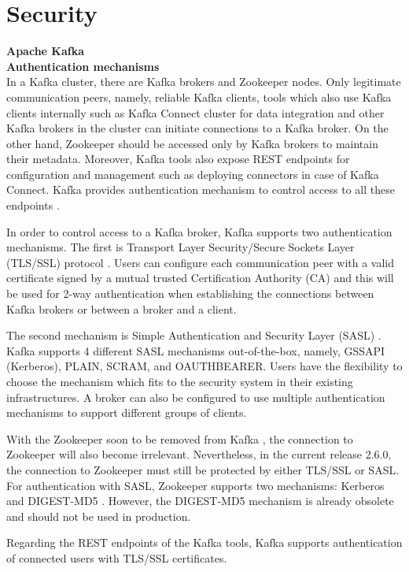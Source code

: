 \section{Security} \label{section:security}
\large \textbf{Apache Kafka}\\
\normalsize
\textbf{Authentication mechanisms}\\
In a Kafka cluster, there are Kafka brokers and Zookeeper nodes. Only legitimate communication peers, namely, reliable Kafka clients, tools which also use Kafka clients internally such as Kafka Connect cluster for data integration and other Kafka brokers in the cluster can initiate connections to a Kafka broker. On the other hand, Zookeeper should be accessed only by Kafka brokers to maintain their metadata. Moreover, Kafka tools also expose REST endpoints for configuration and management such as deploying connectors in case of Kafka Connect. Kafka provides authentication mechanism to control access to all these endpoints \cite{kafkasecurity}.

In order to control access to a Kafka broker, Kafka supports two authentication mechanisms. The first is Transport Layer  Security/Secure Sockets Layer (TLS/SSL) protocol \cite{tls}. Users can configure each communication peer with a valid certificate signed by a mutual trusted Certification Authority (CA) and this will be used for 2-way authentication when establishing the connections between Kafka brokers or between a broker and a client. 

The second mechanism is Simple Authentication and  Security Layer (SASL) \cite{sasl}. Kafka supports 4 different SASL mechanisms out-of-the-box, namely, GSSAPI (Kerberos), PLAIN, SCRAM, and OAUTHBEARER. Users have the flexibility to choose the mechanism which fits to the security system in their existing infrastructures. A broker can also be configured to use multiple authentication mechanisms to support different groups of clients. 

With the Zookeeper soon to be removed from Kafka \cite{kafkaremovezookeeper}, the connection to Zookeeper will also become irrelevant. Nevertheless, in the current release 2.6.0, the connection to Zookeeper must still be protected by either TLS/SSL or SASL. For authentication with SASL, Zookeeper supports two mechanisms: Kerberos and DIGEST-MD5 \cite{zookeepersecurity}. However, the DIGEST-MD5 mechanism is already obsolete and should not be used in production.

Regarding the REST endpoints of the Kafka tools, Kafka supports authentication of connected users with TLS/SSL certificates. 

